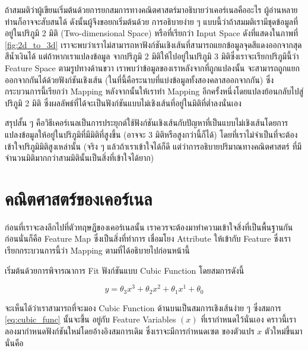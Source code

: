 ถ้าสมมติว่าผู้เขียนเริ่มต้นด้วยการยกสมการทางคณิตศาสตร์มาอธิบายว่าเคอร์เนลคืออะไร ผู้อ่านหลายท่านก็อาจจะสับสนได้ ดังนั้นผู้จึงขอยกเริ่มต้นด้วย%
การอธิบายง่าย ๆ แบบนี้ว่าถ้าสมมติเรามีชุดข้อมูลที่อยู่ในปริภูมิ 2 มิติ (Two-dimensional Space) หรือที่เรียกว่า Input Space ดังที่แสดงในภาพที่
\ref{fig:2d_to_3d} เราจะพบว่าเราไม่สามารถหาฟังก์ชันเชิงเส้นที่สามารถแยกข้อมูลจุดสีแดงออกจากสุดสีน้ำเงินได้ แต่ถ้าหากเราแปลงข้อมูล%
จากปริภูมิ 2 มิติให้ไปอยู่ในปริภูมิ 3 มิติซึ่งเราจะเรียกปริภูมินี้ว่า Feature Space ตามรูปทางด้านขวา เราพบว่าข้อมูลของเราหลังจากที่ถูกแปลงนั้น%
จะสามารถถูกแยกออกจากกันได้ด้วยฟังก์ชันเชิงเส้น (ในที่นี้คือระนาบที่แบ่งข้อมูลทั้งสองคลาสออกจากกัน) ซึ่งกระบวนการนี้เรียกว่า Mapping
หลังจากนั้นให้เราทำ Mapping อีกครั้งหนึ่งโดยแปลงย้อนกลับไปสู่ปริภูมิ 2 มิติ ซึ่งผลลัพธ์ที่ได้จะเป็นฟังก์ชันแบบไม่เชิงเส้นที่อยู่ในมิติที่ต่ำลงนั่นเอง

สรุปสั้น ๆ คือวิธีเคอร์เนลเป็นการประยุกต์ใช้ฟังก์ชันเชิงเส้นกับปัญหาที่เป็นแบบไม่เชิงเส้นโดยการแปลงข้อมูลให้อยู่ในปริภูมิที่มีมิติที่สูงขึ้น (อาจจะ 3
มิติหรือสูงกว่านี้ก็ได้) โดยที่เราไม่จำเป็นที่จะต้องเข้าใจปริภูมิมิติสูงเหล่านั้น (จริง ๆ แล้วถ้าเราเข้าใจได้ก็ดี แต่ว่าการอธิบายปริมาณทางคณิตศาสตร์%
ที่มีจำนวนมิติมากกว่าสามมิตินั้นเป็นสิ่งที่เข้าใจได้ยาก)

\section{คณิตศาสตร์ของเคอร์เนล}
\label{sec:math_kernel}

ก่อนที่เราจะลงลึกไปที่ตัวทฤษฎีของเคอร์เนลนั้น เราควรจะต้องมาทำความเข้าใจสิ่งที่เป็นพื้นฐานกันก่อนนั่นก็คือ Feature Map ซึ่งเป็นสิ่งที่ทำการ%
เชื่อมโยง Attribute ให้เข้ากับ Feature ซึ่งเราเรียกกระบวนการนี้ว่า Mapping ตามที่ได้อธิบายไปก่อนหน้านี้

เริ่มต้นด้วยการพิจารณาการ Fit ฟังก์ชันแบบ Cubic Function โดยสมการดังนี้

\begin{equation}\label{eq:cubic_func}
    y = \theta_{3}x^{3} + \theta_{2}x^{2} + \theta_{1}x^{1} + \theta_{0}
\end{equation}

\noindent จะเห็นได้ว่าเราสามารถที่จะมอง Cubic Function ด้านบนเป็นสมการเชิงเส้นง่าย ๆ ซึ่งสมการ \eqref{eq:cubic_func} นั้นจะขึ้น%
อยู่กับ Feature Variables $(x)$ ที่เรากำหนดไว้นั่นเอง คราวนี้เราลองมากำหนดฟังก์ชันใหม่โดยอ้างอิงสมการเดิม ซึ่งเราจะมีการกำหนดเซต%
ของตัวแปร $x$ ตัวใหม่ขึ้นมานั่นคือ

